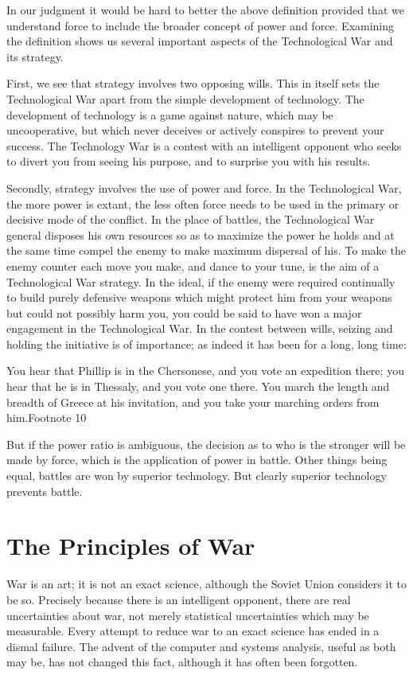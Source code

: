 \documentclass[a4paper,12pt]{book}
\begin{document}
In our judgment it would be hard to better the above definition provided that we understand force to include the broader concept of power and force. Examining the definition shows us several important aspects of the Technological War and its strategy.

First, we see that strategy involves two opposing wills. This in itself sets the Technological War apart from the simple development of technology. The development of technology is a game against nature, which may be uncooperative, but which never deceives or actively conspires to prevent your success. The Technology War is a contest with an intelligent opponent who seeks to divert you from seeing his purpose, and to surprise you with his results.

Secondly, strategy involves the use of power and force. In the Technological War, the more power is extant, the less often force needs to be used in the primary or decisive mode of the conflict. In the place of battles, the Technological War general disposes his own resources so as to maximize the power he holds and at the same time compel the enemy to make maximum dispersal of his. To make the enemy counter each move you make, and dance to your tune, is the aim of a Technological War strategy. In the ideal, if the enemy were required continually to build purely defensive weapons which might protect him from your weapons but could not possibly harm you, you could be said to have won a major engagement in the Technological War. In the contest between wills, seizing and holding the initiative is of importance; as indeed it has been for a long, long time:

You hear that Phillip is in the Chersonese, and you vote an expedition there; you hear that he is in Thessaly, and you vote one there. You march the length and breadth of Greece at his invitation, and you take your marching orders from him.Footnote 10

But if the power ratio is ambiguous, the decision as to who is the stronger will be made by force, which is the application of power in battle. Other things being equal, battles are won by superior technology. But clearly superior technology prevents battle.

\section{The Principles of War}
War is an art; it is not an exact science, although the Soviet Union considers it to be so. Precisely because there is an intelligent opponent, there are real uncertainties about war, not merely statistical uncertainties which may be measurable. Every attempt to reduce war to an exact science has ended in a dismal failure. The advent of the computer and systems analysis, useful as both may be, has not changed this fact, although it has often been forgotten.
\end{document}

